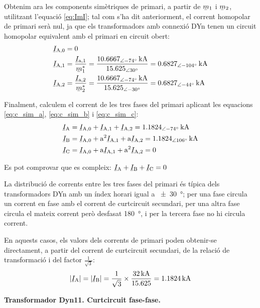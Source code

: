 \begin{exemple}[\CCasimSecTrafo{}]
    Obtenim ara les components simètriques de primari, a partir de $\cmplx{m}_1$ i $\cmplx{m}_2$, utilitzant l'equació \eqref{eq:ImI}; tal com s'ha dit anteriorment, el corrent homopolar de primari serà nul, ja que els transformadors amb connexió DYn tenen un circuit homopolar equivalent amb el primari en circuit obert:
    \begin{align*}
        \cmplx{I}\ped{A,0} &= 0 \\
        \cmplx{I}\ped{A,1} &= \frac{\cmplx{I}\ped{a,1}}{\cmplx{m}^*_1} = \frac{\qtypd{10,6667}{-74}{kA}}{\numpd{15,625}{30}} =  \qtypd{0,6827}{-104}{kA} \\
        \cmplx{I}\ped{A,2} &= \frac{\cmplx{I}\ped{a,2}}{\cmplx{m}^*_2} = \frac{\qtypd{10,6667}{-74}{kA}}{\numpd{15,625}{-30}} = \qtypd{0,6827}{-44}{kA}
    \end{align*}

    Finalment, calculem el corrent de les tres fases del primari aplicant les equacions \eqref{eq:c_sim_a}, \eqref{eq:c_sim_b} i \eqref{eq:c_sim_c}:
     \begin{align*}
        \cmplx{I}\ped{A} &= \cmplx{I}\ped{A,0} + \cmplx{I}\ped{A,1} + \cmplx{I}\ped{A,2} = \qtypd{1,1824}{-74}{kA} \\
        \cmplx{I}\ped{B} &= \cmplx{I}\ped{A,0} + \au^2 \cmplx{I}\ped{A,1} + \au \cmplx{I}\ped{A,2} = \qtypd{1,1824}{106}{kA} \\
        \cmplx{I}\ped{C} &= \cmplx{I}\ped{A,0} + \au \cmplx{I}\ped{A,1} + \au^2 \cmplx{I}\ped{A,2} = 0
    \end{align*}

    Es pot comprovar que es compleix: $\cmplx{I}\ped{A} + \cmplx{I}\ped{B} + \cmplx{I}\ped{C} = 0$

    La distribució de corrents entre les tres fases del primari és típica dels transformadors DYn amb un índex horari igual a \qty{+-30}{\degree}; per una fase circula un corrent en fase amb el corrent de curtcircuit secundari, per una altra fase circula el mateix corrent però desfasat \qty{180}{\degree}, i per la tercera fase no hi circula corrent.

    En aquests casos, els valors dels corrents de primari poden obtenir-se directament, a partir del corrent de curtcircuit secundari, de la relació de transformació i del factor $\frac{1}{\sqrt{3}}$:
    \[
        |\cmplx{I}\ped{A}| = |\cmplx{I}\ped{B}| = \frac{1}{\sqrt{3}} \times \frac{\qty{32}{kA}}{\num{15,625}} = \qty{1,1824}{kA}
    \]

    \textbf{ Transformador Dyn11. Curtcircuit fase-fase.}


\end{exemple}
